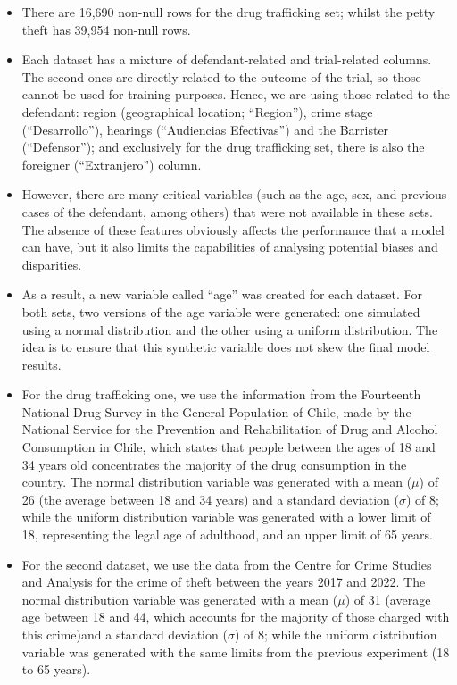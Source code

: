 \documentclass[fleqn,10pt]{wlscirep}
\begin{document}
    \begin{itemize}
        \item There are 16,690 non-null rows for the drug trafficking set; whilst the petty theft has 39,954 non-null rows.
        
        \item Each dataset has a mixture of defendant-related and trial-related columns. The second ones are directly related to the outcome of the trial, so those cannot be used for training purposes. Hence, we are using those related to the defendant: region (geographical location; ``Region''), crime stage (``Desarrollo''), hearings (``Audiencias Efectivas'') and the Barrister (``Defensor''); and exclusively for the drug trafficking set, there is also the foreigner (``Extranjero'') column.  
        
        \item However, there are many critical variables (such as the age, sex, and previous cases of the defendant, among others) that were not available in these sets. The absence of these features obviously affects the performance that a model can have, but it also limits the capabilities of analysing potential biases and disparities. 
        
        \item As a result, a new variable called ``age'' was created for each dataset. For both sets, two versions of the age variable were generated: one simulated using a normal distribution and the other using a uniform distribution. The idea is to ensure that this synthetic variable does not skew the final model results.
        
        \item For the drug trafficking one, we use the information from the Fourteenth National Drug Survey in the General Population of Chile, made by the National Service for the Prevention and Rehabilitation of Drug and Alcohol Consumption \cite{EstudioPG2020} in Chile, which states that people between the ages of 18 and 34 years old concentrates the majority of the drug consumption in the country. The normal distribution variable was generated with a mean ($\mu$) of 26 (the average between 18 and 34 years) and a standard deviation ($\sigma$) of 8; while the uniform distribution variable was generated with a lower limit of 18, representing the legal age of adulthood, and an upper limit of 65 years. 
        
        \item For the second dataset, we use the data from the Centre for Crime Studies and Analysis \cite{PortalCEAD} for the crime of theft between the years 2017 and 2022. The normal distribution variable was generated with a mean ($\mu$) of 31 (average age between 18 and 44, which accounts for the majority of those charged with this crime)and a standard deviation ($\sigma$) of 8; while the uniform distribution variable was generated with the same limits from the previous experiment (18 to 65 years). 
        

\end{itemize}
\end{document}
